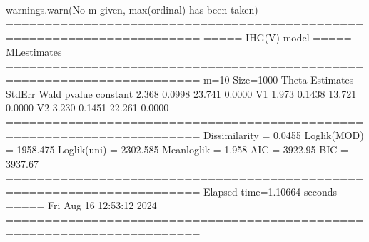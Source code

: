 \documentclass[letterpaper,10pt,english]{sphinxmanual}
\begin{document}
\begin{sphinxVerbatim}[commandchars=\\\{\}]
warnings.warn(\PYGZdq{}No m given, max(ordinal) has been taken\PYGZdq{})
=======================================================================
=====\PYGZgt{}\PYGZgt{}\PYGZgt{} IHG(V) model \PYGZlt{}\PYGZlt{}\PYGZlt{}===== ML\PYGZhy{}estimates
=======================================================================
m=10  Size=1000
\PYGZhy{}\PYGZhy{}\PYGZhy{}\PYGZhy{}\PYGZhy{}\PYGZhy{}\PYGZhy{}\PYGZhy{}\PYGZhy{}\PYGZhy{}\PYGZhy{}\PYGZhy{}\PYGZhy{}\PYGZhy{}\PYGZhy{}\PYGZhy{}\PYGZhy{}\PYGZhy{}\PYGZhy{}\PYGZhy{}\PYGZhy{}\PYGZhy{}\PYGZhy{}\PYGZhy{}\PYGZhy{}\PYGZhy{}\PYGZhy{}\PYGZhy{}\PYGZhy{}\PYGZhy{}\PYGZhy{}\PYGZhy{}\PYGZhy{}\PYGZhy{}\PYGZhy{}\PYGZhy{}\PYGZhy{}\PYGZhy{}\PYGZhy{}\PYGZhy{}\PYGZhy{}\PYGZhy{}\PYGZhy{}\PYGZhy{}\PYGZhy{}\PYGZhy{}\PYGZhy{}\PYGZhy{}\PYGZhy{}\PYGZhy{}\PYGZhy{}\PYGZhy{}\PYGZhy{}\PYGZhy{}\PYGZhy{}\PYGZhy{}\PYGZhy{}\PYGZhy{}\PYGZhy{}\PYGZhy{}\PYGZhy{}\PYGZhy{}\PYGZhy{}\PYGZhy{}\PYGZhy{}\PYGZhy{}\PYGZhy{}\PYGZhy{}\PYGZhy{}\PYGZhy{}\PYGZhy{}
Theta
          Estimates  StdErr     Wald  p\PYGZhy{}value
constant     \PYGZhy{}2.368  0.0998  \PYGZhy{}23.741   0.0000
V1           \PYGZhy{}1.973  0.1438  \PYGZhy{}13.721   0.0000
V2            3.230  0.1451   22.261   0.0000
=======================================================================
Dissimilarity = 0.0455
Loglik(MOD)   = \PYGZhy{}1958.475
Loglik(uni)   = \PYGZhy{}2302.585
Mean\PYGZhy{}loglik   = \PYGZhy{}1.958
\PYGZhy{}\PYGZhy{}\PYGZhy{}\PYGZhy{}\PYGZhy{}\PYGZhy{}\PYGZhy{}\PYGZhy{}\PYGZhy{}\PYGZhy{}\PYGZhy{}\PYGZhy{}\PYGZhy{}\PYGZhy{}\PYGZhy{}\PYGZhy{}\PYGZhy{}\PYGZhy{}\PYGZhy{}\PYGZhy{}\PYGZhy{}\PYGZhy{}\PYGZhy{}\PYGZhy{}\PYGZhy{}\PYGZhy{}\PYGZhy{}\PYGZhy{}\PYGZhy{}\PYGZhy{}\PYGZhy{}\PYGZhy{}\PYGZhy{}\PYGZhy{}\PYGZhy{}\PYGZhy{}\PYGZhy{}\PYGZhy{}\PYGZhy{}\PYGZhy{}\PYGZhy{}\PYGZhy{}\PYGZhy{}\PYGZhy{}\PYGZhy{}\PYGZhy{}\PYGZhy{}\PYGZhy{}\PYGZhy{}\PYGZhy{}\PYGZhy{}\PYGZhy{}\PYGZhy{}\PYGZhy{}\PYGZhy{}\PYGZhy{}\PYGZhy{}\PYGZhy{}\PYGZhy{}\PYGZhy{}\PYGZhy{}\PYGZhy{}\PYGZhy{}\PYGZhy{}\PYGZhy{}\PYGZhy{}\PYGZhy{}\PYGZhy{}\PYGZhy{}\PYGZhy{}\PYGZhy{}
AIC = 3922.95
BIC = 3937.67
=======================================================================
Elapsed time=1.10664 seconds =====\PYGZgt{}\PYGZgt{}\PYGZgt{} Fri Aug 16 12:53:12 2024
=======================================================================
\end{sphinxVerbatim}

\noindent{}
\end{document}
